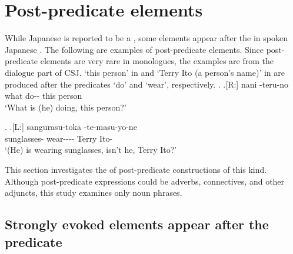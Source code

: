 \section{Post-predicate elements}\label{WOPostPreEles}

While Japanese is reported to be a  \cite{hinds86,shibatani90},
some elements appear after the  in spoken Japanese \cite{kuno78,onosuzuki92,fujii95,takami95a,takami95b,ono06,nakagawaetal08_paper}.
The following are examples of post-predicate elements.
Since post-predicate elements are very rare in monologues,
the examples are from the dialogue part of CSJ.
 `this person' in \Next and  `Terry Ito (a person's name)' in \NNext are produced after the predicates  `do' and  `wear', respectively.
%
\ex.
\ag.[R:] nani -teru-no   \\
 		what do-- this person \\
		`What is (he) doing, this person?'

\ex.\label{D02F0015_TerryIto}
 \ag.[L:] sangurasu-toka -te-masu-yo-ne   \\
		sunglasses- wear---\ab{fp}- Terry Ito- \\
		`(He) is wearing sunglasses, isn't he, Terry Ito?'

This section investigates the  of post-predicate constructions of this kind.
Although post-predicate expressions could be adverbs, connectives, and other adjuncts,
this study examines only noun phrases.

\subsection{Strongly evoked elements appear after the predicate}\label{WORdis}


